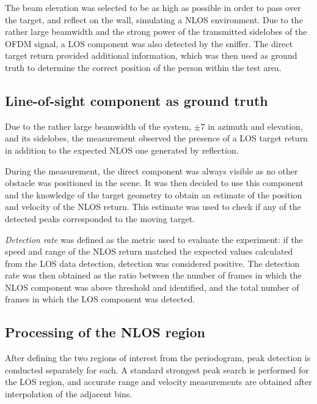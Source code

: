 The beam elevation was selected to be as high as possible in order to pass over the target, and reflect on the wall, simulating a NLOS environment.
Due to the rather large beamwidth and the strong power of the transmitted sidelobes of the OFDM signal, a LOS component was also detected by the sniffer.
The direct target return provided additional information, which was then used as ground truth to determine the correct position of the person within the test area.




\subsection{Line-of-sight component as ground truth}

Due to the rather large beamwidth of the system, $\pm$7\textdegree\hspace{1pt} in azimuth and elevation, and its sidelobes, the measurement observed the presence of a LOS target return in addition to the expected NLOS one generated by reflection.

During the measurement, the direct component was always visible as no other obstacle was positioned in the scene. It was then decided to use this component and the knowledge of the target geometry to obtain an estimate of the position and velocity of the NLOS return. This estimate was used to check if any of the detected peaks corresponded to the moving target.

\textit{Detection rate} was defined as the metric used to evaluate the experiment: if the speed and range of the NLOS return matched the expected values calculated from the LOS data detection, detection was considered positive.
The detection rate was then obtained as the ratio between the number of frames in which the NLOS component was above threshold and identified, and the total number of frames in which the LOS component was detected.

\subsection{Processing of the NLOS region}

After defining the two regions of interest from the periodogram, peak detection is conducted separately for each. A standard strongest peak search is performed for the LOS region, and accurate range and velocity measurements are obtained after interpolation of the adjacent bins.

